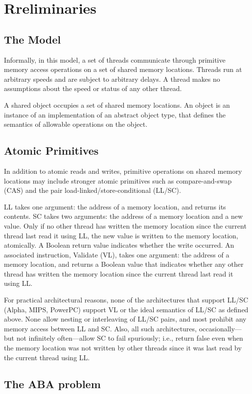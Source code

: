 \documentclass[11pt]{article}
\begin{document}
\section{Rreliminaries}
\label{sec:org4569b97}
\subsection{The Model}
\label{sec:org4cb879a}
Informally, in this model, a set of threads communicate through primitive memory access operations on
a set of shared memory locations. Threads run at arbitrary speeds and are subject to arbitrary delays.
A thread makes no assumptions about the speed or status of any other thread.

A shared object occupies a set of shared memory locations. An object is an instance of an
implementation of an abstract object type, that defines the semantics of allowable operations on the object.
\subsection{Atomic Primitives}
\label{sec:org2196e11}
In addition to atomic reads and writes, primitive operations on shared memory locations may include
stronger atomic primitives such as compare-and-swap (CAS) and the pair load-linked/store-conditional
(LL/SC).

LL takes one argument: the address of a memory location, and returns its contents. SC takes two
arguments: the address of a memory location and a new value. Only if no other thread has written the
memory location since the current thread last read it using LL, the new value is written to the memory
location, atomically. A Boolean return value indicates whether the write occurred. An associated
instruction, Validate (VL), takes one argument: the address of a memory location, and returns a
Boolean value that indicates whether any other thread has written the memory location since the
current thread last read it using LL.

For practical architectural reasons, none of the architectures that support LL/SC (Alpha, MIPS,
PowerPC) support VL or the ideal semantics of LL/SC as defined above. None allow nesting or
interleaving of LL/SC pairs, and most prohibit any memory access between LL and SC. Also, all such
architectures, occasionally—but not infinitely often—allow SC to fail spuriously; i.e., return false
even when the memory location was not written by other threads since it was last read by the current
thread using LL. 
\subsection{The ABA problem}
\label{sec:orgb9480c5}
\label{P1}
\end{document}
